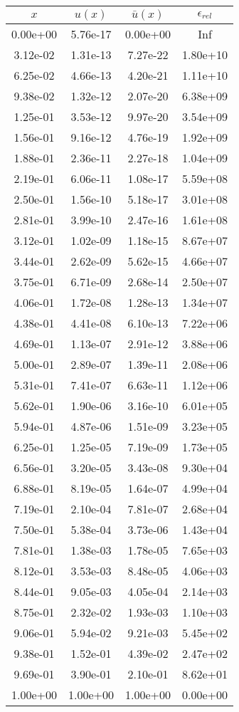\begin{tabular}{|c|c|c|c|}
\hline
\textbf{$x$}&\textbf{$u(x)$}&\textbf{$\bar{u}(x)$}&\textbf{$\epsilon_{rel}$}\\\hline
0.00e+00&5.76e-17&0.00e+00&Inf\\\hline
3.12e-02&1.31e-13&7.27e-22&1.80e+10\\\hline
6.25e-02&4.66e-13&4.20e-21&1.11e+10\\\hline
9.38e-02&1.32e-12&2.07e-20&6.38e+09\\\hline
1.25e-01&3.53e-12&9.97e-20&3.54e+09\\\hline
1.56e-01&9.16e-12&4.76e-19&1.92e+09\\\hline
1.88e-01&2.36e-11&2.27e-18&1.04e+09\\\hline
2.19e-01&6.06e-11&1.08e-17&5.59e+08\\\hline
2.50e-01&1.56e-10&5.18e-17&3.01e+08\\\hline
2.81e-01&3.99e-10&2.47e-16&1.61e+08\\\hline
3.12e-01&1.02e-09&1.18e-15&8.67e+07\\\hline
3.44e-01&2.62e-09&5.62e-15&4.66e+07\\\hline
3.75e-01&6.71e-09&2.68e-14&2.50e+07\\\hline
4.06e-01&1.72e-08&1.28e-13&1.34e+07\\\hline
4.38e-01&4.41e-08&6.10e-13&7.22e+06\\\hline
4.69e-01&1.13e-07&2.91e-12&3.88e+06\\\hline
5.00e-01&2.89e-07&1.39e-11&2.08e+06\\\hline
5.31e-01&7.41e-07&6.63e-11&1.12e+06\\\hline
5.62e-01&1.90e-06&3.16e-10&6.01e+05\\\hline
5.94e-01&4.87e-06&1.51e-09&3.23e+05\\\hline
6.25e-01&1.25e-05&7.19e-09&1.73e+05\\\hline
6.56e-01&3.20e-05&3.43e-08&9.30e+04\\\hline
6.88e-01&8.19e-05&1.64e-07&4.99e+04\\\hline
7.19e-01&2.10e-04&7.81e-07&2.68e+04\\\hline
7.50e-01&5.38e-04&3.73e-06&1.43e+04\\\hline
7.81e-01&1.38e-03&1.78e-05&7.65e+03\\\hline
8.12e-01&3.53e-03&8.48e-05&4.06e+03\\\hline
8.44e-01&9.05e-03&4.05e-04&2.14e+03\\\hline
8.75e-01&2.32e-02&1.93e-03&1.10e+03\\\hline
9.06e-01&5.94e-02&9.21e-03&5.45e+02\\\hline
9.38e-01&1.52e-01&4.39e-02&2.47e+02\\\hline
9.69e-01&3.90e-01&2.10e-01&8.62e+01\\\hline
1.00e+00&1.00e+00&1.00e+00&0.00e+00\\\hline
\end{tabular}
